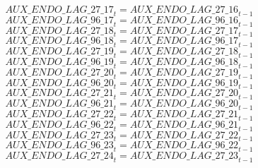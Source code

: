 \begin{dmath}
{AUX\_ENDO\_LAG\_27\_17}_{t}={AUX\_ENDO\_LAG\_27\_16}_{t-1}
\end{dmath}
\begin{dmath}
{AUX\_ENDO\_LAG\_96\_17}_{t}={AUX\_ENDO\_LAG\_96\_16}_{t-1}
\end{dmath}
\begin{dmath}
{AUX\_ENDO\_LAG\_27\_18}_{t}={AUX\_ENDO\_LAG\_27\_17}_{t-1}
\end{dmath}
\begin{dmath}
{AUX\_ENDO\_LAG\_96\_18}_{t}={AUX\_ENDO\_LAG\_96\_17}_{t-1}
\end{dmath}
\begin{dmath}
{AUX\_ENDO\_LAG\_27\_19}_{t}={AUX\_ENDO\_LAG\_27\_18}_{t-1}
\end{dmath}
\begin{dmath}
{AUX\_ENDO\_LAG\_96\_19}_{t}={AUX\_ENDO\_LAG\_96\_18}_{t-1}
\end{dmath}
\begin{dmath}
{AUX\_ENDO\_LAG\_27\_20}_{t}={AUX\_ENDO\_LAG\_27\_19}_{t-1}
\end{dmath}
\begin{dmath}
{AUX\_ENDO\_LAG\_96\_20}_{t}={AUX\_ENDO\_LAG\_96\_19}_{t-1}
\end{dmath}
\begin{dmath}
{AUX\_ENDO\_LAG\_27\_21}_{t}={AUX\_ENDO\_LAG\_27\_20}_{t-1}
\end{dmath}
\begin{dmath}
{AUX\_ENDO\_LAG\_96\_21}_{t}={AUX\_ENDO\_LAG\_96\_20}_{t-1}
\end{dmath}
\begin{dmath}
{AUX\_ENDO\_LAG\_27\_22}_{t}={AUX\_ENDO\_LAG\_27\_21}_{t-1}
\end{dmath}
\begin{dmath}
{AUX\_ENDO\_LAG\_96\_22}_{t}={AUX\_ENDO\_LAG\_96\_21}_{t-1}
\end{dmath}
\begin{dmath}
{AUX\_ENDO\_LAG\_27\_23}_{t}={AUX\_ENDO\_LAG\_27\_22}_{t-1}
\end{dmath}
\begin{dmath}
{AUX\_ENDO\_LAG\_96\_23}_{t}={AUX\_ENDO\_LAG\_96\_22}_{t-1}
\end{dmath}
\begin{dmath}
{AUX\_ENDO\_LAG\_27\_24}_{t}={AUX\_ENDO\_LAG\_27\_23}_{t-1}
\end{dmath}
